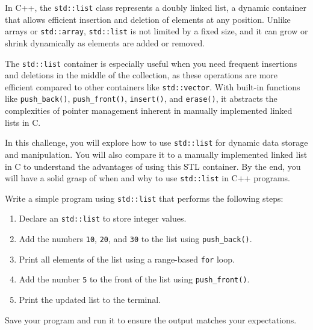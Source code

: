 \begin{challenge}
    \begin{chadescription}
    In C++, the \texttt{std::list} class represents a doubly linked list, a dynamic container that allows efficient insertion and deletion of elements at any position. 
    Unlike arrays or \texttt{std::array}, \texttt{std::list} is not limited by a fixed size, and it can grow or shrink dynamically as elements are added or removed.

    The \texttt{std::list} container is especially useful when you need frequent insertions and deletions in the middle of the collection, as these operations are more efficient compared to other containers like \texttt{std::vector}. 
    With built-in functions like \texttt{push_back()}, \texttt{push_front()}, \texttt{insert()}, and \texttt{erase()}, it abstracts the complexities of pointer management inherent in manually implemented linked lists in C. 

    In this challenge, you will explore how to use \texttt{std::list} for dynamic data storage and manipulation. 
    You will also compare it to a manually implemented linked list in C to understand the advantages of using this STL container. 
    By the end, you will have a solid grasp of when and why to use \texttt{std::list} in C++ programs.
    \end{chadescription}

    \begin{task}
        Write a simple program using \texttt{std::list} that performs the following steps:
        \begin{enumerate}
            \item Declare an \texttt{std::list} to store integer values.
            \item Add the numbers \texttt{10}, \texttt{20}, and \texttt{30} to the list using \texttt{push_back()}.
            \item Print all elements of the list using a range-based \texttt{for} loop.
            \item Add the number \texttt{5} to the front of the list using \texttt{push_front()}.
            \item Print the updated list to the terminal.
        \end{enumerate}

        Save your program and run it to ensure the output matches your expectations.


\end{task}
\end{challenge}
